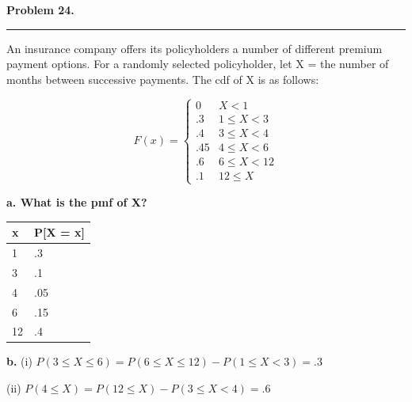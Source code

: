 \textbf{Problem 24.} \\
\hrule 

An insurance company offers its policyholders a number of different premium payment options. For a randomly selected policyholder, let X = the number of months between successive payments. The cdf of X is as follows: 

\[F(x) = \begin{cases}
    0 & X < 1 \\
    .3 & 1 \leq X < 3 \\
    .4 & 3 \leq X < 4 \\
    .45 & 4 \leq X < 6 \\
    .6 & 6 \leq X < 12 \\
    .1 & 12 \leq X
\end{cases} \]

\textbf{a. What is the pmf of X?}

\begin{table}[h]
\begin{tabular}{ll}
\hline
x & P{[}X = x{]} \\ \hline
1 & .3 \\
3 & .1 \\
4 & .05 \\
6 & .15 \\
12 & .4
\end{tabular}
\end{table}

\textbf{b.}
(i) $P(3 \leq X \leq 6) = P(6 \leq X \leq 12) - P(1 \leq X < 3) = \boxed{.3}$

(ii) $P(4 \leq X) = P(12 \leq X) - P(3 \leq X < 4) = \boxed{.6}$